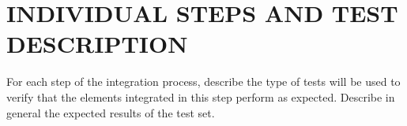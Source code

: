 \section{INDIVIDUAL STEPS AND TEST DESCRIPTION}
For each step of the integration process, describe the type of tests will be used to verify that the elements integrated in this step perform as expected. Describe in general the expected results of the test set.
